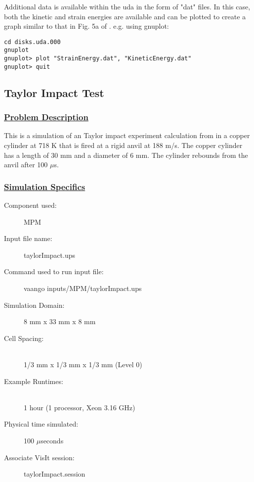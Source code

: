 Additional data is available within the uda in the form of "dat" files.
In this case, both the kinetic and strain energies are available and can
be plotted to create a graph similar to that in Fig. 5a of \cite{Sulsky1994}.
e.g. using gnuplot:

\begin{lstlisting}[backgroundcolor=\color{background}]
cd disks.uda.000
gnuplot
gnuplot> plot "StrainEnergy.dat", "KineticEnergy.dat"
gnuplot> quit
\end{lstlisting}
%
\newpage
\subsection*{\center Taylor Impact Test}
\subsubsection*{\underline{Problem Description}}
This is a simulation of an Taylor impact experiment calculation from 
\cite{Gust1982} in a copper cylinder at 718 K that is fired at a
rigid anvil at 188 m/s.  The copper cylinder has a length of 30 mm and
a diameter of 6 mm.  The cylinder rebounds from the anvil after 100 $\mu$s.
 
\subsubsection*{\underline{Simulation Specifics}}
\begin{description} 
\item [Component used:] \hfill MPM
\item [Input file name:] \hfill taylorImpact.ups
\item [Command used to run input file:]\hfill vaango inputs/MPM/taylorImpact.ups
\item [Simulation Domain:]\hfill 8 mm x 33 mm x 8 mm

\item [Cell Spacing:]\hfill \\ 
  1/3 mm x 1/3 mm x 1/3 mm (Level 0)

\item [Example Runtimes:] \hfill \\
  1 hour   (1 processor, Xeon 3.16 GHz)\\

\item [Physical time simulated:] \hfill 100 $\mu$seconds

\item [Associate VisIt session:] \hfill taylorImpact.session

\end{description}

